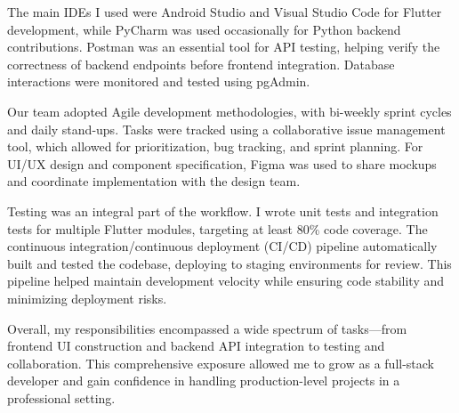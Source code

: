 The main IDEs I used were Android Studio and Visual Studio Code for Flutter development, while PyCharm was used occasionally for Python backend contributions. Postman was an essential tool for API testing, helping verify the correctness of backend endpoints before frontend integration. Database interactions were monitored and tested using pgAdmin.

Our team adopted Agile development methodologies, with bi-weekly sprint cycles and daily stand-ups. Tasks were tracked using a collaborative issue management tool, which allowed for prioritization, bug tracking, and sprint planning. For UI/UX design and component specification, Figma was used to share mockups and coordinate implementation with the design team.

Testing was an integral part of the workflow. I wrote unit tests and integration tests for multiple Flutter modules, targeting at least 80\% code coverage. The continuous integration/continuous deployment (CI/CD) pipeline automatically built and tested the codebase, deploying to staging environments for review. This pipeline helped maintain development velocity while ensuring code stability and minimizing deployment risks.

Overall, my responsibilities encompassed a wide spectrum of tasks—from frontend UI construction and backend API integration to testing and collaboration. This comprehensive exposure allowed me to grow as a full-stack developer and gain confidence in handling production-level projects in a professional setting.

